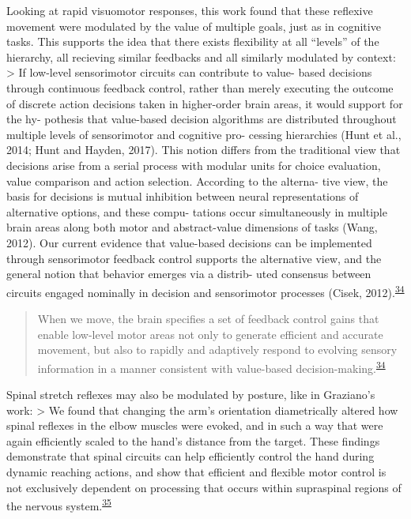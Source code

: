 \documentclass[
  a4paper,
]{article}
\begin{document}
Looking at rapid visuomotor responses, this work found that these
reflexive movement were modulated by the value of multiple goals, just
as in cognitive tasks. This supports the idea that there exists
flexibility at all ``levels'' of the hierarchy, all recieving similar
feedbacks and all similarly modulated by context: \textgreater{} If
low-level sensorimotor circuits can contribute to value- based decisions
through continuous feedback control, rather than merely executing the
outcome of discrete action decisions taken in higher-order brain areas,
it would support for the hy- pothesis that value-based decision
algorithms are distributed throughout multiple levels of sensorimotor
and cognitive pro- cessing hierarchies (Hunt et al., 2014; Hunt and
Hayden, 2017). This notion differs from the traditional view that
decisions arise from a serial process with modular units for choice
evaluation, value comparison and action selection. According to the
alterna- tive view, the basis for decisions is mutual inhibition between
neural representations of alternative options, and these compu- tations
occur simultaneously in multiple brain areas along both motor and
abstract-value dimensions of tasks (Wang, 2012). Our current evidence
that value-based decisions can be implemented through sensorimotor
feedback control supports the alternative view, and the general notion
that behavior emerges via a distrib- uted consensus between circuits
engaged nominally in decision and sensorimotor processes (Cisek,
2012).\textsuperscript{\protect\hyperlink{ref-carrollRapidVisuomotorResponses2019}{34}}

\begin{quote}
When we move, the brain specifies a set of feedback control gains that
enable low-level motor areas not only to generate efficient and accurate
movement, but also to rapidly and adaptively respond to evolving sensory
information in a manner consistent with value-based
decision-making.\textsuperscript{\protect\hyperlink{ref-carrollRapidVisuomotorResponses2019}{34}}
\end{quote}

Spinal stretch reflexes may also be modulated by posture, like in
Graziano's work: \textgreater{} We found that changing the arm's
orientation diametrically altered how spinal reflexes in the elbow
muscles were evoked, and in such a way that were again efficiently
scaled to the hand's distance from the target. These findings
demonstrate that spinal circuits can help efficiently control the hand
during dynamic reaching actions, and show that efficient and flexible
motor control is not exclusively dependent on processing that occurs
within supraspinal regions of the nervous
system.\textsuperscript{\protect\hyperlink{ref-weiler2020}{35}}
\end{document}
